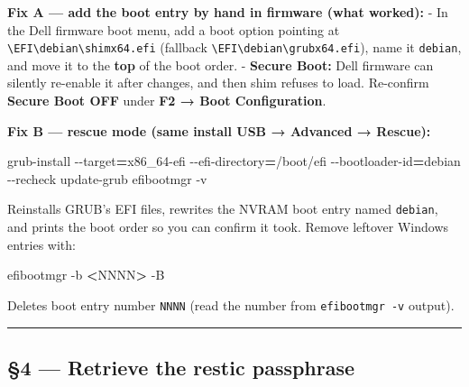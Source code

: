 \documentclass[
]{article}
\newenvironment{Shaded}{\begin{snugshade}}{\end{snugshade}}
\newcommand{\AttributeTok}[1]{\textcolor[rgb]{0.77,0.63,0.00}{#1}}
\newcommand{\ExtensionTok}[1]{#1}
\newcommand{\NormalTok}[1]{#1}
\newcommand{\OperatorTok}[1]{\textcolor[rgb]{0.81,0.36,0.00}{\textbf{#1}}}
\begin{document}
\textbf{Fix A --- add the boot entry by hand in firmware (what worked):}
- In the Dell firmware boot menu, add a boot option pointing at
\texttt{\textbackslash{}EFI\textbackslash{}debian\textbackslash{}shimx64.efi}
(fallback
\texttt{\textbackslash{}EFI\textbackslash{}debian\textbackslash{}grubx64.efi}),
name it \texttt{debian}, and move it to the \textbf{top} of the boot
order. - \textbf{Secure Boot:} Dell firmware can silently re-enable it
after changes, and then shim refuses to load. Re-confirm \textbf{Secure
Boot OFF} under \textbf{F2 → Boot Configuration}.

\textbf{Fix B --- rescue mode (same install USB → Advanced → Rescue):}

\begin{Shaded}
\begin{Highlighting}[]
\ExtensionTok{grub{-}install} \AttributeTok{{-}{-}target}\OperatorTok{=}\NormalTok{x86\_64{-}efi }\AttributeTok{{-}{-}efi{-}directory}\OperatorTok{=}\NormalTok{/boot/efi }\AttributeTok{{-}{-}bootloader{-}id}\OperatorTok{=}\NormalTok{debian }\AttributeTok{{-}{-}recheck}
\ExtensionTok{update{-}grub}
\ExtensionTok{efibootmgr} \AttributeTok{{-}v}
\end{Highlighting}
\end{Shaded}

Reinstalls GRUB's EFI files, rewrites the NVRAM boot entry named
\texttt{debian}, and prints the boot order so you can confirm it took.
Remove leftover Windows entries with:

\begin{Shaded}
\begin{Highlighting}[]
\ExtensionTok{efibootmgr} \AttributeTok{{-}b} \OperatorTok{\textless{}}\NormalTok{NNNN}\OperatorTok{\textgreater{}}\NormalTok{ {-}B}
\end{Highlighting}
\end{Shaded}

Deletes boot entry number \texttt{NNNN} (read the number from
\texttt{efibootmgr\ -v} output).

\begin{center}\rule{0.5\linewidth}{0.5pt}\end{center}

\hypertarget{retrieve-the-restic-passphrase}{%
\subsection{§4 --- Retrieve the restic
passphrase}\label{retrieve-the-restic-passphrase}}
\end{document}
